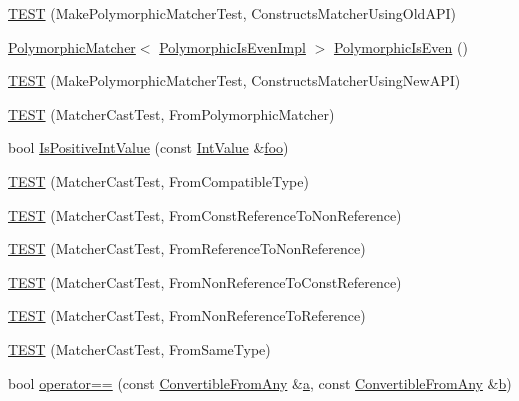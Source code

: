 \begin{DoxyCompactItemize}
\item 
\hyperlink{namespacetesting_1_1gmock__matchers__test_aad0604e47fea147ae133d134b4606a26}{T\+E\+ST} (Make\+Polymorphic\+Matcher\+Test, Constructs\+Matcher\+Using\+Old\+A\+PI)
\item 
\hyperlink{classtesting_1_1_polymorphic_matcher}{Polymorphic\+Matcher}$<$ \hyperlink{classtesting_1_1gmock__matchers__test_1_1_polymorphic_is_even_impl}{Polymorphic\+Is\+Even\+Impl} $>$ \hyperlink{namespacetesting_1_1gmock__matchers__test_a8a0035a0de2d219d89ff7070762ece72}{Polymorphic\+Is\+Even} ()
\item 
\hyperlink{namespacetesting_1_1gmock__matchers__test_a619d872aa86419c5093327f64c466df3}{T\+E\+ST} (Make\+Polymorphic\+Matcher\+Test, Constructs\+Matcher\+Using\+New\+A\+PI)
\item 
\hyperlink{namespacetesting_1_1gmock__matchers__test_afffaa6f2c436edb7c46e7a16ed2de825}{T\+E\+ST} (Matcher\+Cast\+Test, From\+Polymorphic\+Matcher)
\item 
bool \hyperlink{namespacetesting_1_1gmock__matchers__test_a68565741c989968637db5a9e10e55020}{Is\+Positive\+Int\+Value} (const \hyperlink{classtesting_1_1gmock__matchers__test_1_1_int_value}{Int\+Value} \&\hyperlink{namespacetesting_1_1gmock__matchers__test_a3536e68112ffbb1f76887cd15bb45c15}{foo})
\item 
\hyperlink{namespacetesting_1_1gmock__matchers__test_aa7a28536a6c59d56bbbbdb4fa5ba9e4d}{T\+E\+ST} (Matcher\+Cast\+Test, From\+Compatible\+Type)
\item 
\hyperlink{namespacetesting_1_1gmock__matchers__test_a9d25aac0defd9296bf207cacd342aff0}{T\+E\+ST} (Matcher\+Cast\+Test, From\+Const\+Reference\+To\+Non\+Reference)
\item 
\hyperlink{namespacetesting_1_1gmock__matchers__test_a4bb3955a1e0b603c0156c98a2dc49eea}{T\+E\+ST} (Matcher\+Cast\+Test, From\+Reference\+To\+Non\+Reference)
\item 
\hyperlink{namespacetesting_1_1gmock__matchers__test_a6fd48b8275f96d9d4ee840f0ec590fb1}{T\+E\+ST} (Matcher\+Cast\+Test, From\+Non\+Reference\+To\+Const\+Reference)
\item 
\hyperlink{namespacetesting_1_1gmock__matchers__test_ab8d3174b8f1ab799906938ed9984643b}{T\+E\+ST} (Matcher\+Cast\+Test, From\+Non\+Reference\+To\+Reference)
\item 
\hyperlink{namespacetesting_1_1gmock__matchers__test_a8f845dd5b1bcdc660926d67dce32b5d2}{T\+E\+ST} (Matcher\+Cast\+Test, From\+Same\+Type)
\item 
bool \hyperlink{namespacetesting_1_1gmock__matchers__test_af0b7ba716a9150ff6db37abda4b44fc8}{operator==} (const \hyperlink{structtesting_1_1gmock__matchers__test_1_1_convertible_from_any}{Convertible\+From\+Any} \&\hyperlink{_07copy_08_2_read_camera_model_8m_a551a3d351eadcc0b9b1a2f24f0fb5ea0}{a}, const \hyperlink{structtesting_1_1gmock__matchers__test_1_1_convertible_from_any}{Convertible\+From\+Any} \&\hyperlink{jquery_8js_a2fa551895933fae935a0a6b87282241d}{b})

\end{DoxyCompactItemize}
